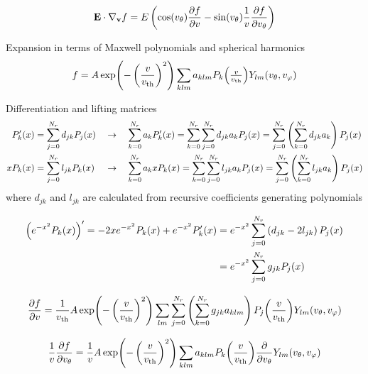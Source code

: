 \documentclass{article}[draft]
\begin{document}
\begin{align*}
\vect{E}\cdot \nabla_{\vect{v}} f
= E 
\left( \cos\of{\vtheta} \frac{\partial f}{\partial \vr} 
- \sin\of{\vtheta} \frac{1}{\vr} \frac{\partial f}{\partial \vtheta} \right)
\end{align*}

Expansion in terms of Maxwell polynomials and spherical harmonics
\begin{align*}
f = A 
\exp\of{-\left(\frac{\vr}{\vth}\right)^2} 
\sum_{klm} a_{klm} P_k\of{\textstyle\frac{v}{\vth}} Y_{lm}\of{\vtheta,\vphi}
\end{align*}

Differentiation and lifting matrices
\begin{align*}
P^\prime_k\of{x} &= \sum_{j=0}^{N_r} d_{jk} P_j\of{x}
&
&\rightarrow \quad
\sum_{k=0}^{N_r} a_k P^\prime_k\of{x} 
= \sum_{k=0}^{N_r} \sum_{j=0}^{N_r} d_{jk} a_k P_j\of{x}
= \sum_{j=0}^{N_r} \left( \sum_{k=0}^{N_r} d_{jk} a_k \right) P_j\of{x}
\\
x P_k\of{x} &= \sum_{j=0}^{N_r} l_{jk} P_k\of{x}
&
&\rightarrow \quad
\sum_{k=0}^{N_r} a_k x P_k\of{x} 
= \sum_{k=0}^{N_r} \sum_{j=0}^{N_r} l_{jk} a_k P_j\of{x}
= \sum_{j=0}^{N_r} \left( \sum_{k=0}^{N_r} l_{jk} a_k \right) P_j\of{x}
\end{align*}
where $d_{jk}$ and $l_{jk}$ are calculated from recursive coefficients generating polynomials

\begin{align*}
\left( e^{-x^2} P_k\of{x} \right)^\prime
= - 2 x e^{-x^2} P_k\of{x} + e^{-x^2} P^\prime_k\of{x}
&= e^{-x^2} \sum_{j=0}^{N_r} \left( d_{jk} - 2 l_{jk} \right)P_j\of{x}
\\
&= e^{-x^2} \sum_{j=0}^{N_r} g_{jk} P_j\of{x}
\end{align*}

\begin{align*}
\frac{\partial f}{\partial v}
=
\frac{1}{\vth}
A \exp\of{-\left(\frac{\vr}{\vth}\right)^2} 
\sum_{lm} \sum_{j=0}^{N_r} 
\left(\sum_{k=0}^{N_r} g_{jk} a_{klm} \right) 
P_j\of{\frac{\vr}{\vth}} Y_{lm}\of{\vtheta,\vphi}
\end{align*}

\begin{align*}
\frac{1}{\vr}\frac{\partial f}{\partial \vtheta}
=
\frac{1}{\vr} A \exp\of{-\left(\frac{\vr}{\vth}\right)^2} 
\sum_{klm} a_{klm} P_k\of{\frac{\vr}{\vth}} 
\frac{\partial}{\partial \vtheta} Y_{lm}\of{\vtheta,\vphi}
\end{align*}
\end{document}
